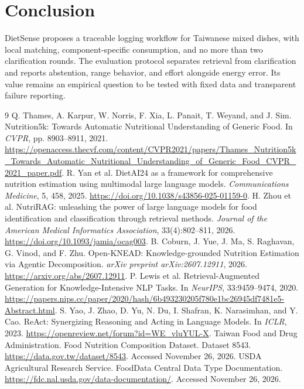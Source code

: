 \documentclass[11pt,a4paper]{article}
\begin{document}
\section{Conclusion}
DietSense proposes a traceable logging workflow for Taiwanese mixed dishes, with local matching, component-specific consumption, and no more than two clarification rounds. The evaluation protocol separates retrieval from clarification and reports abstention, range behavior, and effort alongside energy error. Its value remains an empirical question to be tested with fixed data and transparent failure reporting.
\begingroup\small\setlength{\parskip}{0pt}\begin{thebibliography}{9}\setlength{\itemsep}{2pt}
 Q. Thames, A. Karpur, W. Norris, F. Xia, L. Panait, T. Weyand, and J. Sim.
Nutrition5k: Towards Automatic Nutritional Understanding of Generic Food.
In \emph{CVPR}, pp. 8903--8911, 2021.
\url{https://openaccess.thecvf.com/content/CVPR2021/papers/Thames_Nutrition5k_Towards_Automatic_Nutritional_Understanding_of_Generic_Food_CVPR_2021_paper.pdf}.
 R. Yan et al.
DietAI24 as a framework for comprehensive nutrition estimation using multimodal large language models.
\emph{Communications Medicine}, 5, 458, 2025.
\url{https://doi.org/10.1038/s43856-025-01159-0}.
 H. Zhou et al.
NutriRAG: unleashing the power of large language models for food identification and classification through retrieval methods.
\emph{Journal of the American Medical Informatics Association}, 33(4):802--811, 2026.
\url{https://doi.org/10.1093/jamia/ocag003}.
 B. Coburn, J. Yue, J. Ma, S. Raghavan, G. Vinod, and F. Zhu.
Open-KNEAD: Knowledge-grounded Nutrition Estimation via Agentic Decomposition.
\emph{arXiv preprint arXiv:2607.12911}, 2026.
\url{https://arxiv.org/abs/2607.12911}.
 P. Lewis et al.
Retrieval-Augmented Generation for Knowledge-Intensive NLP Tasks.
In \emph{NeurIPS}, 33:9459--9474, 2020.
\url{https://papers.nips.cc/paper/2020/hash/6b493230205f780e1bc26945df7481e5-Abstract.html}.
 S. Yao, J. Zhao, D. Yu, N. Du, I. Shafran, K. Narasimhan, and Y. Cao.
ReAct: Synergizing Reasoning and Acting in Language Models.
In \emph{ICLR}, 2023.
\url{https://openreview.net/forum?id=WE_vluYUL-X}.
 Taiwan Food and Drug Administration.
Food Nutrition Composition Dataset. Dataset 8543.
\url{https://data.gov.tw/dataset/8543}. Accessed November 26, 2026.
 USDA Agricultural Research Service.
FoodData Central Data Type Documentation.
\url{https://fdc.nal.usda.gov/data-documentation/}. Accessed November 26, 2026.
\end{thebibliography}\endgroup
\end{document}
